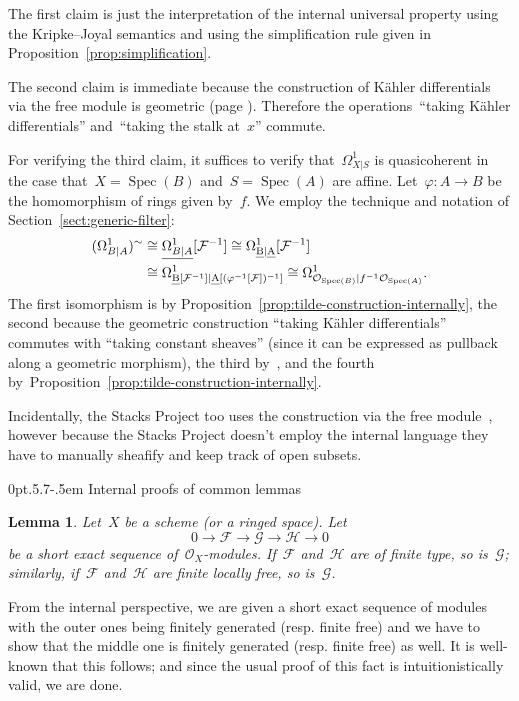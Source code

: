 \documentclass[10pt,reqno,a4paper]{amsbook}
\makeatletter
\theoremstyle{definition}
\theoremstyle{plain}
\newtheorem{lemma}[defn]{Lemma}
\theoremstyle{remark}
\newcommand{\F}{\mathcal{F}}
\renewcommand{\G}{\mathcal{G}}
\renewcommand{\H}{\mathcal{H}}
\renewcommand{\O}{\mathcal{O}}
\let\oldul\ul
\renewcommand{\ul}[1]{\text{\oldul{$#1$}}}
\DeclareMathOperator{\Spec}{Spec}
\newcommand{\?}{\,{:}\,}
\renewcommand{\_}{\mathpunct{.}\,}
\newcommand{\lra}{\longrightarrow}
\newcommand{\resp}{resp.\@\xspace}
\newcommand{\stacksproject}[1]{\cite[{\href{https://stacks.math.columbia.edu/tag/#1}{Tag~#1}}]{stacks-project}}
\renewenvironment{proof}[1][\proofname]{\par
  \pushQED{\qed}%
  \normalfont \topsep6\p@\@plus6\p@\relax
  \trivlist
  \item[\hskip\labelsep
        \itshape
    #1\@addpunct{.}]\ignorespaces
}{%
  \popQED\endtrivlist\@endpefalse
}
\def\subsection{\@startsection{subsection}{2}%
  {0pt}{.5\linespacing\@plus.7\linespacing}{-.5em}%
  {\normalfont\bfseries}}
\makeatother
\begin{document}
\begin{proof}The first claim is just the interpretation of the internal
universal property using the Kripke--Joyal semantics and using the
simplification rule given in Proposition~\ref{prop:simplification}.

The second claim is immediate because the construction of Kähler differentials
via the free module is geometric (page
\pageref{page:geometric-constructions}). Therefore the operations~``taking
Kähler differentials'' and~``taking the stalk at~$x$'' commute.

For verifying the third claim, it suffices to verify that~$\Omega^1_{X|S}$ is
quasicoherent in the case that~$X = \Spec(B)$ and~$S = \Spec(A)$ are affine.
Let~$\varphi : A \to B$ be the homomorphism of rings given by~$f$. We employ the
technique and notation of Section~\ref{sect:generic-filter}:
\begin{align*}
  (\Omega^1_{B|A})^\sim &\cong
  \underline{\Omega^1_{B|A}}[\F^{-1}] \cong
  \Omega^1_{\ul{B}|\ul{A}}[\F^{-1}] \\
  &\cong
  \Omega^1_{\ul{B}[\F^{-1}]|\ul{A}[(\varphi^{-1}[\F])^{-1}]} \cong
  \Omega^1_{\O_{\Spec(B)}|f^{-1}\O_{\Spec(A)}}.
\end{align*}
The first isomorphism is by
Proposition~\ref{prop:tilde-construction-internally}, the second because the
geometric construction ``taking Kähler differentials'' commutes with ``taking
constant sheaves'' (since it can be expressed as pullback along a geometric
morphism), the third by~\stacksproject{00RT}, and the fourth
by~Proposition~\ref{prop:tilde-construction-internally}.
\end{proof}

Incidentally, the Stacks Project too uses the construction via the free
module~\stacksproject{08RL}, however because the Stacks Project doesn't employ
the internal language they have to manually sheafify and keep track of open
subsets.


\subsection{Internal proofs of common lemmas}

\begin{lemma}Let~$X$ be a scheme (or a ringed space). Let
\[ 0 \lra \F \lra \G \lra \H \lra 0 \]
be a short exact sequence of~$\O_X$-modules. If~$\F$ and~$\H$ are of finite
type, so is~$\G$; similarly, if~$\F$ and~$\H$ are finite locally free, so
is~$\G$.
\end{lemma}
\begin{proof}From the internal perspective, we are given a short exact sequence
of modules with the outer ones being finitely generated (\resp finite free)
and we have to show that the middle one is finitely generated (\resp finite
free) as well. It is well-known that this follows; and since the usual proof of
this fact is intuitionistically valid, we are done.
\end{proof}
\end{document}
